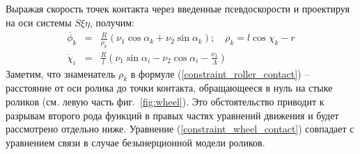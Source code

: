 Выражая скорость точек контакта через введенные псевдоскорости и проектируя на оси системы $S\xi\eta$, получим:
\begin{eqnarray}
\dot{\phi_k} &=& \frac{R}{\rho_k }(\nu_1\cos\alpha_k + \nu_2\sin\alpha_k); \quad \rho_k  = l\cos\chi_k - r \label{constraint_roller_contact}\\
\dot{\chi}_i &=& \frac{R}{l}(\nu_1\sin\alpha_i - \nu_2\cos\alpha_i - \frac{\nu_3}{\Lambda})\label{constraint_wheel_contact}
\end{eqnarray}
Заметим, что знаменатель $\rho_k$ в формуле (\ref{constraint_roller_contact}) -- расстояние от оси ролика до точки контакта, обращающееся в нуль на стыке роликов (см. левую часть фиг.~\ref{fig:wheel}). Это обстоятельство приводит к разрывам второго рода функций в правых частях уравнений движения и будет рассмотрено отдельно ниже.
Уравнение (\ref{constraint_wheel_contact}) совпадает с уравнением связи в случае безынерционной модели роликов. 



